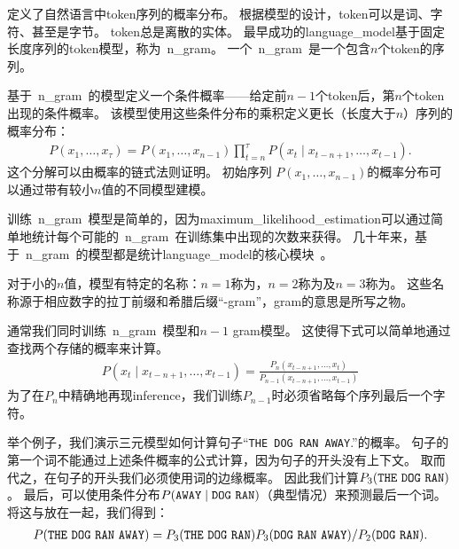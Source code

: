 定义了自然语言中\gls{token}序列的概率分布。
根据模型的设计，\gls{token}可以是词、字符、甚至是字节。
\gls{token}总是离散的实体。
最早成功的\gls{language_model}基于固定长度序列的\gls{token}模型，称为~\gls{n_gram}。
一个~\gls{n_gram}~是一个包含$n$个\gls{token}的序列。


基于~\gls{n_gram}~的模型定义一个条件概率——给定前$n-1$个\gls{token}后，第$n$个\gls{token}出现的条件概率。
该模型使用这些条件分布的乘积定义更长（长度大于$n$）序列的概率分布：
\begin{align}
P(x_1, \dots, x_\tau) = P(x_1, \dots, x_{n-1}) \prod_{t=n}^\tau P(x_t \mid x_{t-n+1}, \dots, x_{t-1} ).
\end{align}
这个分解可以由概率的链式法则证明。
初始序列 $P(x_1, \dots, x_{n-1})$的概率分布可以通过带有较小$n$值的不同模型建模。

训练~\gls{n_gram}~模型是简单的，因为\gls{maximum_likelihood_estimation}可以通过简单地统计每个可能的~\gls{n_gram}~在训练集中出现的次数来获得。                                   
几十年来，基于~\gls{n_gram}~的模型都是统计\gls{language_model}的核心模块~\citep{Jelinek+Mercer80,Katz87,Chen+Goodman99}。

对于小的$n$值，模型有特定的名称：$n=1$称为，$n=2$称为及$n=3$称为。
这些名称源于相应数字的拉丁前缀和希腊后缀``-gram''，gram的意思是所写之物。


通常我们同时训练~\gls{n_gram}~模型和$n-1$ gram模型。 
这使得下式可以简单地通过查找两个存储的概率来计算。
\begin{align}
\label{eq:ml-ngram}
P(x_t \mid x_{t-n+1}, \dots, x_{t-1}) = \frac{P_n(x_{t-n+1}, \dots, x_t)} { P_{n-1}( x_{t-n+1}, \dots, x_{t-1}) }
\end{align}
为了在$P_n$中精确地再现\gls{inference}，我们训练$P_{n-1}$时必须省略每个序列最后一个字符。

举个例子，我们演示三元模型如何计算句子``{\tt THE DOG RAN AWAY}.''的概率。
句子的第一个词不能通过上述条件概率的公式计算，因为句子的开头没有上下文。
取而代之，在句子的开头我们必须使用词的边缘概率。
因此我们计算$P_3({\tt THE\ DOG\ RAN})$。
最后，可以使用条件分布$P({\tt AWAY} \mid {\tt DOG\ RAN})$（典型情况）来预测最后一个词。
将这与放在一起，我们得到：
\begin{align}
P({\tt THE\ DOG\ RAN\ AWAY}) = P_3({\tt THE\ DOG\ RAN}) P_3({\tt DOG\ RAN\ AWAY}) / P_2({\tt DOG\ RAN}).
\end{align}

